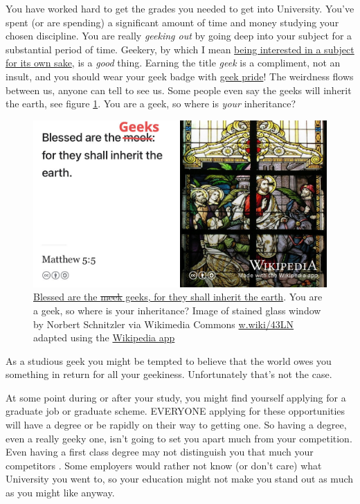 \documentclass[
]{book}
\begin{document}
You have worked hard to get the grades you needed to get into University. You've spent (or are spending) a significant amount of time and money studying your chosen discipline. You are really \emph{geeking out} by going deep into your subject for a substantial period of time. Geekery, by which I mean \href{https://en.wikipedia.org/wiki/Geek}{being interested in a subject for its own sake}, is a \emph{good} thing. Earning the title \emph{geek} is a compliment, not an insult, and you should wear your geek badge with \href{https://en.wikipedia.org/wiki/Geek_Pride_Day}{geek pride}! The weirdness flows between us, anyone can tell to see us. \citep{freakscene} Some people even say the geeks will inherit the earth, see figure \ref{fig:geekout-fig}. You are a geek, so where is \emph{your} inheritance?

\begin{figure}

{\centering \includegraphics[width=0.99\linewidth]{images/blessed-are-the-geeks} 

}

\caption{\href{https://en.wikipedia.org/wiki/Matthew_5:5}{Blessed are the \sout{meek} geeks, for they shall inherit the earth}. \citep{inherit, blessed} You are a geek, so where is your inheritance? Image of stained glass window by Norbert Schnitzler via Wikimedia Commons \href{https://w.wiki/43LN}{w.wiki/43LN} adapted using the \href{https://apps.apple.com/us/app/wikipedia/id324715238}{Wikipedia app}}\label{fig:geekout-fig}
\end{figure}



As a studious geek you might be tempted to believe that the world owes you something in return for all your geekiness. Unfortunately that's not the case.

At some point during or after your study, you might find yourself applying for a graduate job or graduate scheme. EVERYONE applying for these opportunities will have a degree or be rapidly on their way to getting one. So having a degree, even a really geeky one, isn't going to set you apart much from your competition. Even having a first class degree may not distinguish you that much your competitors \citep{gradeinflation, firstclass}. Some employers would rather not know (or don't care) what University you went to, so your education might not make you stand out as much as you might like anyway. \citep{bigfour, eyfirm}
\end{document}
